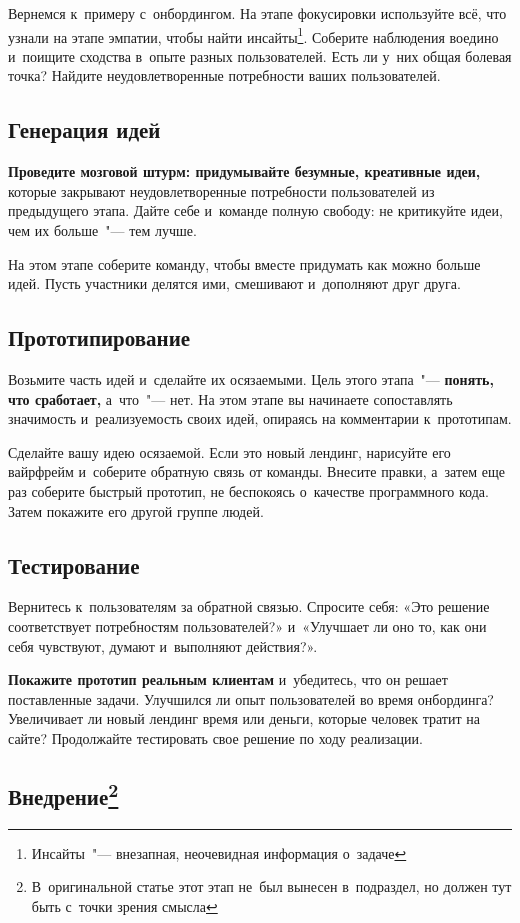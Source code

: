 \documentclass[12pt]{article}
\begin{document}
Вернемся к~примеру с~онбордингом. На этапе фокусировки используйте всё, что узнали на этапе эмпатии, чтобы найти инсайты\footnote{Инсайты~"--- внезапная, неочевидная информация о~задаче}. Соберите наблюдения воедино и~поищите сходства в~опыте разных пользователей. Есть ли у~них общая болевая точка? Найдите неудовлетворенные потребности ваших пользователей. 

\subsection*{Генерация идей}
\textbf{Проведите мозговой штурм: придумывайте безумные, креативные идеи,} которые закрывают неудовлетворенные потребности пользователей из предыдущего этапа. Дайте себе и~команде полную свободу: не критикуйте идеи, чем их больше~"--- тем лучше.

На этом этапе соберите команду, чтобы вместе придумать как можно больше идей. Пусть участники делятся ими, смешивают и~дополняют друг друга.

\subsection*{Прототипирование}
Возьмите часть идей и~сделайте их осязаемыми. Цель этого этапа~"--- \textbf{понять, что сработает,} а~что~"--- нет. На этом этапе вы начинаете сопоставлять значимость и~реализуемость своих идей, опираясь на комментарии к~прототипам. 

Сделайте вашу идею осязаемой. Если это новый лендинг, нарисуйте его вайрфрейм и~соберите обратную связь от команды. Внесите правки, а~затем еще раз соберите быстрый прототип, не беспокоясь о~качестве программного кода. Затем покажите его другой группе людей.  

\subsection*{Тестирование}
Вернитесь к~пользователям за обратной связью. Спросите себя: «Это решение соответствует потребностям пользователей?» и~«Улучшает ли оно то, как они себя чувствуют, думают и~выполняют действия?».

\textbf{Покажите прототип реальным клиентам} и~убедитесь, что он решает поставленные задачи. Улучшился ли опыт пользователей во время онбординга? Увеличивает ли новый лендинг время или деньги, которые человек тратит на сайте? Продолжайте тестировать свое решение по ходу реализации.

\subsection*{Внедрение\footnote{В~оригинальной статье этот этап не~был вынесен в~подраздел, но должен тут быть с~точки зрения смысла}}
\end{document}
